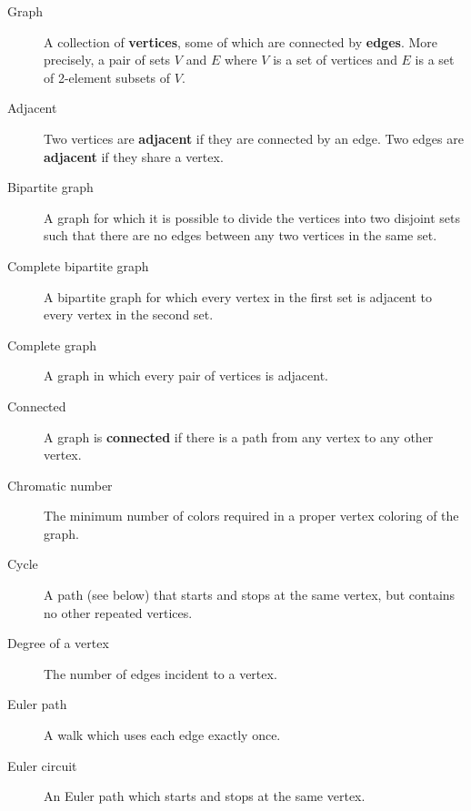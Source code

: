 \documentclass[12pt,]{book}
\newcommand{\terminology}[1]{\textbf{#1}}
\theoremstyle{plain}
\theoremstyle{definition}
\theoremstyle{definition}
\theoremstyle{definition}
\numberwithin{equation}{chapter}
\begin{document}
\begin{assemblage}\label{assemblage-39}
\hypertarget{p-1566}{}%
%
\begin{description}
\item[{Graph}]\hypertarget{li-701}{}\hypertarget{p-1567}{}%
 A collection of \terminology{vertices}, some of which are connected by \terminology{edges}. More precisely, a pair of sets \(V\) and \(E\) where \(V\) is a set of vertices and \(E\) is a set of 2-element subsets of \(V\).%
\item[{Adjacent}]\hypertarget{li-702}{}\hypertarget{p-1568}{}%
 Two vertices are \terminology{adjacent} if they are connected by an edge. Two edges are \terminology{adjacent} if they share a vertex.%
\item[{Bipartite graph}]\hypertarget{li-703}{}\hypertarget{p-1569}{}%
 A graph for which it is possible to divide the vertices into two disjoint sets such that there are no edges between any two vertices in the same set.%
\item[{Complete bipartite graph}]\hypertarget{li-704}{}\hypertarget{p-1570}{}%
A bipartite graph for which every vertex in the first set is adjacent to every vertex in the second set.%
\item[{Complete graph}]\hypertarget{li-705}{}\hypertarget{p-1571}{}%
 A graph in which every pair of vertices is adjacent.%
\item[{Connected}]\hypertarget{li-706}{}\hypertarget{p-1572}{}%
 A graph is \terminology{connected} if there is a path from any vertex to any other vertex.%
\item[{Chromatic number}]\hypertarget{li-707}{}\hypertarget{p-1573}{}%
 The minimum number of colors required in a proper vertex coloring of the graph.%
\item[{Cycle}]\hypertarget{li-708}{}\hypertarget{p-1574}{}%
 A path (see below) that starts and stops at the same vertex, but contains no other repeated vertices.%
\item[{Degree of a vertex}]\hypertarget{li-709}{}\hypertarget{p-1575}{}%
 The number of edges incident to a vertex.%
\item[{Euler path}]\hypertarget{li-710}{}\hypertarget{p-1576}{}%
A walk which uses each edge exactly once.%
\item[{Euler circuit}]\hypertarget{li-711}{}\hypertarget{p-1577}{}%
 An Euler path which starts and stops at the same vertex.%

\end{description}
\end{assemblage}
\end{document}
